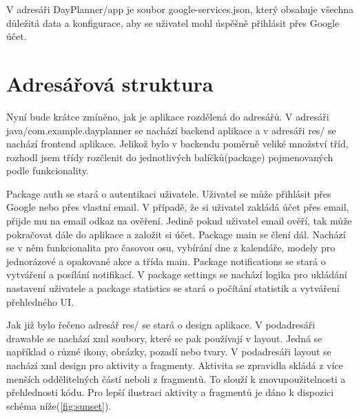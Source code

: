 V adresáři DayPlanner/app je soubor google-services.json, který obsahuje všechna důležitá data a konfigurace, aby se uživatel mohl úspěšně přihlásit přes Google účet.

\newpage
\section{Adresářová struktura}
\hspace{14pt} Nyní bude krátce zmíněno, jak je aplikace rozdělená do adresářů. V adresáři java/com.example.dayplanner se nachází backend aplikace a v adresáři res/ se nachází frontend aplikace. Jelikož bylo v backendu poměrně veliké množství tříd, rozhodl jsem třídy rozčlenit do jednotlivých balíčků(package) pojmenovaných podle funkcionality. 


Package auth se stará o autentikaci uživatele. Uživatel se může přihlásit přes Google nebo přes vlastní email. V případě, že si uživatel zakládá účet přes email, přijde mu na email odkaz na ověření. Jedině pokud uživatel email ověří, tak může pokračovat dále do aplikace a založit si účet. Package main se člení dál. Nachází se v něm funkcionalita pro časovou osu, vybírání dne z kalendáře, modely pro jednorázové a opakované akce a třída main. Package notifications se stará o vytváření a posílání notifikací. V package settings se nachází logika pro ukládání nastavení uživatele a package statistics se stará o počítání statistik a vytváření přehledného UI.

Jak již bylo řečeno adresář res/ se stará o design aplikace. V podadresáři drawable se nachází xml soubory, které se pak používají v layout. Jedná se například o různé ikony, obrázky, pozadí nebo tvary. V podadresáři layout se nachází xml design pro aktivity a fragmenty. Aktivita se zpravidla skládá z více menších oddělitelných částí neboli z fragmentů. To slouží k znovupoužitelnosti a přehlednosti kódu. Pro lepší ilustraci aktivity a fragmentů je dáno k dispozici schéma níže(\autoref{fig:sunset}). 

